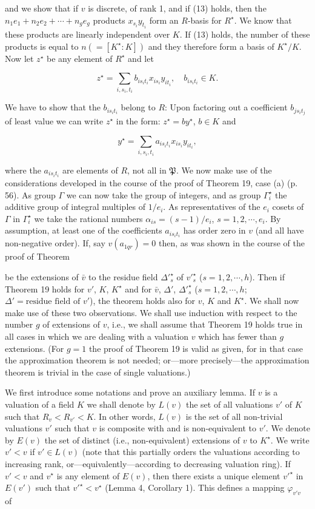 and we show that if $v$ is discrete, of rank 1, and if (13) holds, then the $n_1e_1 + n_2e_2 + \cdots + n_ge_g$ products $x_{s_i}y_{t_i}$ form an $R$-basis for $R^\star$. We know that these products are linearly independent over $K$. If (13) holds, the number of these products is equal to $n (= [K^\star : K])$ and they therefore form a basis of $K^\star / K$. Now let $z^\star$ be any element of $R^\star$ and let

$$z^\star = \sum_{i,s_i,t_i} b_{is_i t_i} x_{is_i} y_{it_i}, \quad b_{is_i t_i} \in K.$$

We have to show that the $b_{is_i t_i}$ belong to $R$: Upon factoring out a coefficient $b_{js_i t_j}$ of least value we can write $z^\star$ in the form: $z^\star = by^\star$, $b \in K$ and

$$y^\star = \sum_{i,s_i,t_i} a_{is_i t_i} x_{is_i} y_{it_i},$$

where the $a_{is_i t_i}$ are elements of $R$, not all in $\mathfrak{P}$. We now make use of the considerations developed in the course of the proof of Theorem 19, case (a) (p. 56). As group $\Gamma$ we can now take the group of integers, and as group $\Gamma_i^\star$ the additive group of integral multiples of $1/e_i$. As representatives of the $e_i$ cosets of $\Gamma$ in $\Gamma_i^\star$ we take the rational numbers $\alpha_{is} = (s-1)/e_i$, $s=1, 2, \cdots, e_i$. By assumption, at least one of the coefficients $a_{is_i t_i}$ has order zero in $v$ (and all have non-negative order). If, say $v(a_{1qr})=0$ then, as was shown in the course of the proof of Theorem

be the extensions of $\bar{v}$ to the residue field $\Delta'_s^\star$ of $v'_s^\star$ ($s=1, 2, \cdots, h$). Then if Theorem 19 holds for $v'$, $K$, $K^\star$ and for $\bar{v}$, $\Delta'$, $\Delta'_s^\star$ ($s=1, 2, \cdots, h$; $\Delta' = \text{residue field of } v'$), the theorem holds also for $v$, $K$ and $K^\star$. We shall now make use of these two observations. We shall use induction with respect to the number $g$ of extensions of $v$, i.e., we shall assume that Theorem 19 holds true in all cases in which we are dealing with a valuation $v$ which has fewer than $g$ extensions. (For $g=1$ the proof of Theorem 19 is valid as given, for in that case the approximation theorem is not needed; or—more precisely—the approximation theorem is trivial in the case of single valuations.)

We first introduce some notations and prove an auxiliary lemma. If $v$ is a valuation of a field $K$ we shall denote by $L(v)$ the set of all valuations $v'$ of $K$ such that $R_v < R_{v'} < K$. In other words, $L(v)$ is the set of all non-trivial valuations $v'$ such that $v$ is composite with and is non-equivalent to $v'$. We denote by $E(v)$ the set of distinct (i.e., non-equivalent) extensions of $v$ to $K^\star$. We write $v' < v$ if $v' \in L(v)$ (note that this partially orders the valuations according to increasing rank, or—equivalently—according to decreasing valuation ring). If $v' < v$ and $v^\star$ is any element of $E(v)$, then there exists a unique element $v'^\star$ in $E(v')$ such that $v'^\star < v^\star$ (Lemma 4, Corollary 1). This defines a mapping $\varphi_{v'v}$ of